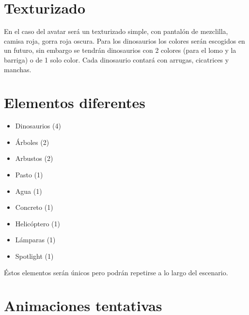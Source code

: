 \documentclass[12pt]{article} %
\begin{document}
\begin{center}
\begin{tabular}{ | m{19em} | m{19em} | }
			\hline
		\end{tabular}
	\end{center}

	\newpage
	
	\section{Texturizado}
	
	\setlength{\parindent}{1.0cm}
	En el caso del avatar será un texturizado simple, con pantalón de mezclilla, camisa roja, gorra roja oscura. 
	Para los dinosaurios los colores serán escogidos en un futuro, sin embargo se tendrán dinosaurios con 2 colores 
	(para el lomo y la barriga) o de 1 solo color. Cada dinosaurio contará con arrugas, cicatrices y manchas.
	\setlength{\parindent}{0.0cm}
	
	\section{Elementos diferentes}
	
	\begin{itemize}
		\item[\textbullet] Dinosaurios (4)
		\item[\textbullet] Árboles (2)
		\item[\textbullet] Arbustos (2)
		\item[\textbullet] Pasto (1)
		\item[\textbullet] Agua (1)
		\item[\textbullet] Concreto (1)
		\item[\textbullet] Helicóptero (1)
		\item[\textbullet] Lámparas (1)
		\item[\textbullet] Spotlight (1)
 	\end{itemize}
 	
 	Éstos elementos serán únicos pero podrán repetirse a lo largo del escenario.
 	
 	\section{Animaciones tentativas}
	
\end{document}
